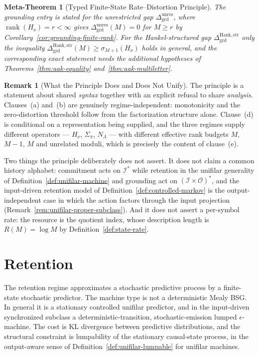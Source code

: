 \documentclass[12pt]{article}
\newtheorem{metatheorem}[theorem]{Meta-Theorem}
\theoremstyle{definition}
\newtheorem{remark}[theorem]{Remark}
\newcommand{\Dunres}{\Delta_{\mathrm{grd}}^{\mathrm{unres}}}
\newcommand{\DHankstr}{\Delta_{\mathrm{grd}}^{\mathrm{Hank,str}}}
\begin{document}
\begin{metatheorem}[Typed Finite-State Rate--Distortion Principle]
\noindent
The grounding entry is stated for the \emph{unrestricted} gap $\Dunres$, where
$\operatorname{rank}(H_\nu)=r<\infty$ gives $\Dunres(M)=0$ for $M\ge r$ by
Corollary~\ref{cor:grounding-finite-rank}.  For the Hankel-structured gap
$\DHankstr$ only the inequality $\DHankstr(M)\ge\sigma_{M+1}(H_\nu)$ holds in
general, and the corresponding exact statement needs the additional hypotheses
of Theorems~\ref{thm:aak-equality} and~\ref{thm:aak-multiletter}.
\end{metatheorem}

\begin{remark}[What the Principle Does and Does Not Unify]
\label{rem:typed-principle-scope}
The principle is a statement about shared \emph{syntax} together with an
explicit refusal to share \emph{analysis}.  Clauses~(a) and~(b) are genuinely
regime-independent: monotonicity and the zero-distortion threshold follow from
the factorization structure alone.  Clause~(d) is conditional on a
representation being supplied, and the three regimes supply different operators
--- $H_\nu$, $\Sigma_\pi$, $N_\Lambda$ --- with different effective rank
budgets $M$, $M-1$, $M$ and unrelated moduli, which is precisely the content of
clause~(e).

Two things the principle deliberately does not assert.  It does not claim a
common history alphabet: commitment acts on $\mathcal I^*$ while retention in
the unifilar generality of Definition~\ref{def:unifilar-machine} and grounding
act on $(\mathcal I\times\mathcal O)^*$, and the input-driven retention model
of Definition~\ref{def:controlled-markov} is the output-independent case in
which the action factors through the input projection
(Remark~\ref{rem:unifilar-proper-subclass}).  And it does not assert a
per-symbol rate: the resource is the quotient index, whose description length
is $R(M)=\log M$ by Definition~\ref{def:state-rate}.
\end{remark}

\section{Retention}
\label{sec:retention}

The retention regime approximates a stochastic predictive process by a
finite-state stochastic predictor.  The machine type is not a deterministic
Mealy BSG.  In general it is a stationary controlled unifilar predictor, and in
the input-driven synchronized subclass a deterministic-transition,
stochastic-emission lumped $\epsilon$-machine.  The cost is KL divergence
between predictive distributions, and the structural constraint is lumpability
of the stationary causal-state process, in the output-aware sense of
Definition~\ref{def:unifilar-lumpable} for unifilar machines.
\end{document}
